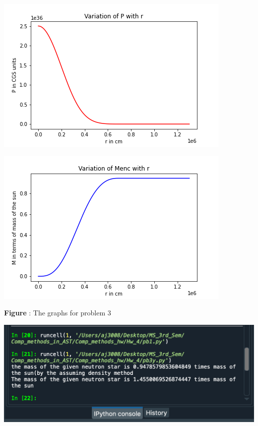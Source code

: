 \documentclass{article}
\begin{document}
\begin{itemize}
\emph{\small{}}
\begin{center}
\begin{multicols}{2}
	\begin{center}
        \includegraphics[scale=0.3]{Images/Pr_pb3}
        \end{center}
\columnbreak
       \includegraphics[scale=0.3]{Images/Mr_pb3}
\end{multicols}
\textbf{Figure }: The graphs for problem 3
\end{center}
\vspace{0.2em}
	\begin{center}
        \includegraphics[scale=0.2]{Images/Output_pb3}
          \vspace{0.2em}
          

\end{center}
\end{itemize}
\end{document}
